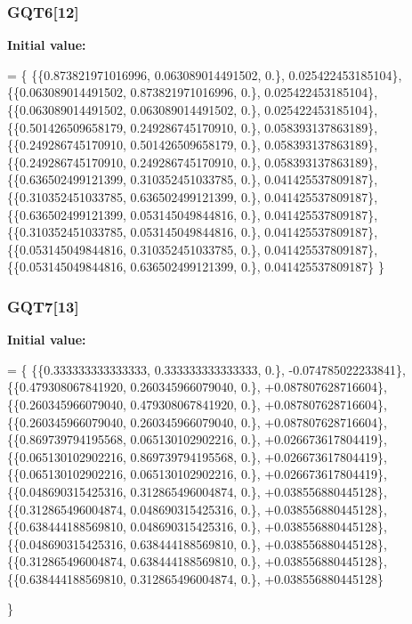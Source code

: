 \subsubsection[{G\-Q\-T6}]{ G\-Q\-T6[12]}\label{GaussQuadratureTri_8cc_a89351403e7d645bf9dfcfb251d942c6e}
{\bfseries Initial value\-:}
\begin{DoxyCode}
= \{
  \{\{0.873821971016996, 0.063089014491502, 0.\}, 0.025422453185104\},
  \{\{0.063089014491502, 0.873821971016996, 0.\}, 0.025422453185104\},
  \{\{0.063089014491502, 0.063089014491502, 0.\}, 0.025422453185104\},
  \{\{0.501426509658179, 0.249286745170910, 0.\}, 0.058393137863189\},
  \{\{0.249286745170910, 0.501426509658179, 0.\}, 0.058393137863189\},
  \{\{0.249286745170910, 0.249286745170910, 0.\}, 0.058393137863189\},
  \{\{0.636502499121399, 0.310352451033785, 0.\}, 0.041425537809187\},
  \{\{0.310352451033785, 0.636502499121399, 0.\}, 0.041425537809187\},
  \{\{0.636502499121399, 0.053145049844816, 0.\}, 0.041425537809187\},
  \{\{0.310352451033785, 0.053145049844816, 0.\}, 0.041425537809187\},
  \{\{0.053145049844816, 0.310352451033785, 0.\}, 0.041425537809187\},
  \{\{0.053145049844816, 0.636502499121399, 0.\}, 0.041425537809187\}
\}
\end{DoxyCode}
\subsubsection[{G\-Q\-T7}]{ G\-Q\-T7[13]}\label{GaussQuadratureTri_8cc_a844d6699b611fd7061305c8f188af52d}
{\bfseries Initial value\-:}
\begin{DoxyCode}
= \{
  \{\{0.333333333333333, 0.333333333333333, 0.\}, -0.074785022233841\},
  \{\{0.479308067841920, 0.260345966079040, 0.\}, +0.087807628716604\},
  \{\{0.260345966079040, 0.479308067841920, 0.\}, +0.087807628716604\},
  \{\{0.260345966079040, 0.260345966079040, 0.\}, +0.087807628716604\},
  \{\{0.869739794195568, 0.065130102902216, 0.\}, +0.026673617804419\},
  \{\{0.065130102902216, 0.869739794195568, 0.\}, +0.026673617804419\},
  \{\{0.065130102902216, 0.065130102902216, 0.\}, +0.026673617804419\},
  \{\{0.048690315425316, 0.312865496004874, 0.\}, +0.038556880445128\},
  \{\{0.312865496004874, 0.048690315425316, 0.\}, +0.038556880445128\},
  \{\{0.638444188569810, 0.048690315425316, 0.\}, +0.038556880445128\},
  \{\{0.048690315425316, 0.638444188569810, 0.\}, +0.038556880445128\},
  \{\{0.312865496004874, 0.638444188569810, 0.\}, +0.038556880445128\},
  \{\{0.638444188569810, 0.312865496004874, 0.\}, +0.038556880445128\}

\}
\end{DoxyCode}
